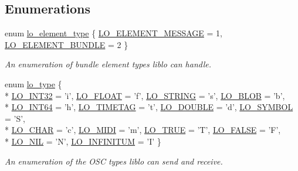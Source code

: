 \subsection*{Enumerations}
\begin{DoxyCompactItemize}
\item 
enum \hyperlink{group__liblo_ga08432d01f2b8f4a32ffa58992a821f28}{lo\+\_\+element\+\_\+type} \{ \hyperlink{group__liblo_gga08432d01f2b8f4a32ffa58992a821f28aef47b7b86b453d77bc37737400a2ad64}{L\+O\+\_\+\+E\+L\+E\+M\+E\+N\+T\+\_\+\+M\+E\+S\+S\+A\+G\+E} = 1, 
\hyperlink{group__liblo_gga08432d01f2b8f4a32ffa58992a821f28a35773b57d50789d1ac7e7e38d2b291c2}{L\+O\+\_\+\+E\+L\+E\+M\+E\+N\+T\+\_\+\+B\+U\+N\+D\+L\+E} = 2
 \}
\begin{DoxyCompactList}\small\item\em An enumeration of bundle element types liblo can handle. \end{DoxyCompactList}\item 
enum \hyperlink{group__liblo_ga11838c576b0197c255ce805fd7434736}{lo\+\_\+type} \{ \\*
\hyperlink{group__liblo_gga11838c576b0197c255ce805fd7434736a4ba0490216baf238719e1200325b037d}{L\+O\+\_\+\+I\+N\+T32} = 'i', 
\hyperlink{group__liblo_gga11838c576b0197c255ce805fd7434736ab3245e1b7edacde57f71d200840b0aa3}{L\+O\+\_\+\+F\+L\+O\+A\+T} = 'f', 
\hyperlink{group__liblo_gga11838c576b0197c255ce805fd7434736a6121bddbedc79af47d86a8a25af47ad2}{L\+O\+\_\+\+S\+T\+R\+I\+N\+G} = 's', 
\hyperlink{group__liblo_gga11838c576b0197c255ce805fd7434736a140f48c944b6c888846b8109ceaeb98b}{L\+O\+\_\+\+B\+L\+O\+B} = 'b', 
\\*
\hyperlink{group__liblo_gga11838c576b0197c255ce805fd7434736acfabb7d6ec1d4f9d033227de24c76b30}{L\+O\+\_\+\+I\+N\+T64} = 'h', 
\hyperlink{group__liblo_gga11838c576b0197c255ce805fd7434736a0516741a260e7109d2b0ed0c92beddbe}{L\+O\+\_\+\+T\+I\+M\+E\+T\+A\+G} = 't', 
\hyperlink{group__liblo_gga11838c576b0197c255ce805fd7434736a0ca92c843dfb45f4edabdefd60cdeca6}{L\+O\+\_\+\+D\+O\+U\+B\+L\+E} = 'd', 
\hyperlink{group__liblo_gga11838c576b0197c255ce805fd7434736a4ae18ed5170672498406c36b16e7a948}{L\+O\+\_\+\+S\+Y\+M\+B\+O\+L} = 'S', 
\\*
\hyperlink{group__liblo_gga11838c576b0197c255ce805fd7434736af93c0cdf731b1edf4b9d44ad7d7dba26}{L\+O\+\_\+\+C\+H\+A\+R} = 'c', 
\hyperlink{group__liblo_gga11838c576b0197c255ce805fd7434736ad295b5f7669a7220102082e20fd14ec0}{L\+O\+\_\+\+M\+I\+D\+I} = 'm', 
\hyperlink{group__liblo_gga11838c576b0197c255ce805fd7434736ace8c12ac58d6aaee426dc41cfa609009}{L\+O\+\_\+\+T\+R\+U\+E} = 'T', 
\hyperlink{group__liblo_gga11838c576b0197c255ce805fd7434736ae85a45e7bc3999069d82da7245d172f4}{L\+O\+\_\+\+F\+A\+L\+S\+E} = 'F', 
\\*
\hyperlink{group__liblo_gga11838c576b0197c255ce805fd7434736a80fcaab02318c562b094ca407f81d2b3}{L\+O\+\_\+\+N\+I\+L} = 'N', 
\hyperlink{group__liblo_gga11838c576b0197c255ce805fd7434736a9b77e96b653de1f91344549b9b9a0273}{L\+O\+\_\+\+I\+N\+F\+I\+N\+I\+T\+U\+M} = 'I'
 \}
\begin{DoxyCompactList}\small\item\em An enumeration of the O\+S\+C types liblo can send and receive. \end{DoxyCompactList}\end{DoxyCompactItemize}
